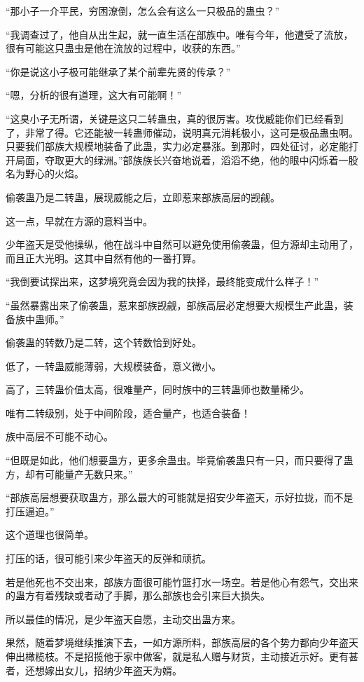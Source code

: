 \begin{this_body}
“那小子一介平民，穷困潦倒，怎么会有这么一只极品的蛊虫？”

“我调查过了，他自从出生起，就一直生活在部族中。唯有今年，他遭受了流放，很有可能这只蛊虫是他在流放的过程中，收获的东西。”

“你是说这小子极可能继承了某个前辈先贤的传承？”

“嗯，分析的很有道理，这大有可能啊！”

“这臭小子无所谓，关键是这只二转蛊虫，真的很厉害。攻伐威能你们已经看到了，非常了得。它还能被一转蛊师催动，说明真元消耗极小，这可是极品蛊虫啊。只要我们部族大规模地装备了此蛊，实力必定暴涨。到那时，四处征讨，必定能打开局面，夺取更大的绿洲。”部族族长兴奋地说着，滔滔不绝，他的眼中闪烁着一股名为野心的火焰。

偷袭蛊乃是二转蛊，展现威能之后，立即惹来部族高层的觊觎。

这一点，早就在方源的意料当中。

少年盗天是受他操纵，他在战斗中自然可以避免使用偷袭蛊，但方源却主动用了，而且正大光明。这其中自然有他的一番打算。

“我倒要试探出来，这梦境究竟会因为我的抉择，最终能变成什么样子！”

“虽然暴露出来了偷袭蛊，惹来部族觊觎，部族高层必定想要大规模生产此蛊，装备族中蛊师。”

偷袭蛊的转数乃是二转，这个转数恰到好处。

低了，一转蛊威能薄弱，大规模装备，意义微小。

高了，三转蛊价值太高，很难量产，同时族中的三转蛊师也数量稀少。

唯有二转级别，处于中间阶段，适合量产，也适合装备！

族中高层不可能不动心。

“但既是如此，他们想要蛊方，更多余蛊虫。毕竟偷袭蛊只有一只，而只要得了蛊方，却有可能量产无数只来。”

“部族高层想要获取蛊方，那么最大的可能就是招安少年盗天，示好拉拢，而不是打压逼迫。”

这个道理也很简单。

打压的话，很可能引来少年盗天的反弹和顽抗。

若是他死也不交出来，部族方面很可能竹篮打水一场空。若是他心有怨气，交出来的蛊方有着残缺或者动了手脚，那么部族也会引来巨大损失。

所以最佳的情况，是少年盗天自愿，主动交出蛊方来。

果然，随着梦境继续推演下去，一如方源所料，部族高层的各个势力都向少年盗天伸出橄榄枝。不是招揽他于家中做客，就是私人赠与财货，主动接近示好。更有甚者，还想嫁出女儿，招纳少年盗天为婿。


\end{this_body}
